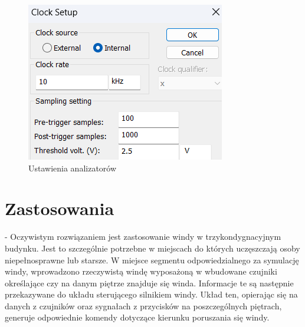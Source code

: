 \documentclass[a4paper]{article}
\begin{document}
\begin{figure}[H]
    \centering
    \includegraphics{direction_controller_test_logic_analizer_settings.png}
    \caption{Ustawienia analizatorów}
\end{figure}

\section{Zastosowania}
- Oczywistym rozwiązaniem jest zastosowanie windy w trzykondygnacyjnym budynku. Jest to szczególnie potrzebne w miejscach do których uczęszczają osoby niepełnosprawne lub starsze.
 W miejsce segmentu odpowiedzialnego za symulację windy,
  wprowadzono rzeczywistą windę wyposażoną w wbudowane czujniki określające czy na danym piętrze znajduje się winda.
     Informacje te są następnie przekazywane do układu sterującego silnikiem windy.
      Układ ten, opierając się na danych z czujników oraz sygnałach z przycisków na poszczególnych piętrach,
       generuje odpowiednie komendy dotyczące kierunku poruszania się windy.
       
\end{document}
